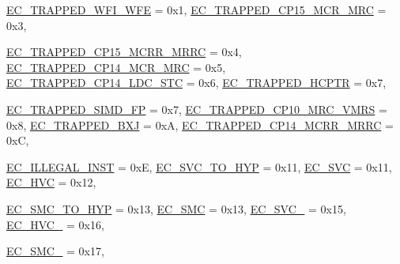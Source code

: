\begin{DoxyCompactItemize}
\hyperlink{namespaceArmISA_a04034d12009cf36227f4d2abff3331a2a7831a48e786b2211c5757053c628fb37}{EC\_\-TRAPPED\_\-WFI\_\-WFE} =  0x1, 
\hyperlink{namespaceArmISA_a04034d12009cf36227f4d2abff3331a2a7326abbdb0c5aa8868f49e78499eba5e}{EC\_\-TRAPPED\_\-CP15\_\-MCR\_\-MRC} =  0x3, 
\par
\hyperlink{namespaceArmISA_a04034d12009cf36227f4d2abff3331a2ae41f0031978e2f2e12002fba1d4f6a31}{EC\_\-TRAPPED\_\-CP15\_\-MCRR\_\-MRRC} =  0x4, 
\hyperlink{namespaceArmISA_a04034d12009cf36227f4d2abff3331a2a8a5017e4c7ca5216f0410d21036353f8}{EC\_\-TRAPPED\_\-CP14\_\-MCR\_\-MRC} =  0x5, 
\hyperlink{namespaceArmISA_a04034d12009cf36227f4d2abff3331a2ac33900dd88579a4aa9bae803767ed0c8}{EC\_\-TRAPPED\_\-CP14\_\-LDC\_\-STC} =  0x6, 
\hyperlink{namespaceArmISA_a04034d12009cf36227f4d2abff3331a2a899543f43806081dbcfe81a4b9a95b60}{EC\_\-TRAPPED\_\-HCPTR} =  0x7, 
\par
\hyperlink{namespaceArmISA_a04034d12009cf36227f4d2abff3331a2a3d4170a7cceedfc489d0ae7c1c9eb8e5}{EC\_\-TRAPPED\_\-SIMD\_\-FP} =  0x7, 
\hyperlink{namespaceArmISA_a04034d12009cf36227f4d2abff3331a2ac72c24870c9cd495bee1ae47130f4b15}{EC\_\-TRAPPED\_\-CP10\_\-MRC\_\-VMRS} =  0x8, 
\hyperlink{namespaceArmISA_a04034d12009cf36227f4d2abff3331a2ab0a91ec0cef7a2eb141d3243d69e38a9}{EC\_\-TRAPPED\_\-BXJ} =  0xA, 
\hyperlink{namespaceArmISA_a04034d12009cf36227f4d2abff3331a2a93c43a851e130dcb5065a53947f1689e}{EC\_\-TRAPPED\_\-CP14\_\-MCRR\_\-MRRC} =  0xC, 
\par
\hyperlink{namespaceArmISA_a04034d12009cf36227f4d2abff3331a2a9516886bbf1b55fd57b83d8e303eae33}{EC\_\-ILLEGAL\_\-INST} =  0xE, 
\hyperlink{namespaceArmISA_a04034d12009cf36227f4d2abff3331a2aeef28e1b068793c10bc30feb6efe2af0}{EC\_\-SVC\_\-TO\_\-HYP} =  0x11, 
\hyperlink{namespaceArmISA_a04034d12009cf36227f4d2abff3331a2a765f8b894a0b0e643c3d7e9147914f8a}{EC\_\-SVC} =  0x11, 
\hyperlink{namespaceArmISA_a04034d12009cf36227f4d2abff3331a2a501829f9087619157c26ce7e6a117abb}{EC\_\-HVC} =  0x12, 
\par
\hyperlink{namespaceArmISA_a04034d12009cf36227f4d2abff3331a2accc170f9cef44ae4617ab0f86bc56cb4}{EC\_\-SMC\_\-TO\_\-HYP} =  0x13, 
\hyperlink{namespaceArmISA_a04034d12009cf36227f4d2abff3331a2a8c961b3ba70ec48f8318449cfbe53f55}{EC\_\-SMC} =  0x13, 
\hyperlink{namespaceArmISA_a04034d12009cf36227f4d2abff3331a2a00178dc3ca6d98fb310130aaa1c37c7e}{EC\_\-SVC\_} =  0x15, 
\hyperlink{namespaceArmISA_a04034d12009cf36227f4d2abff3331a2a3124fcbf99991e4633f3dcaf0062c662}{EC\_\-HVC\_} =  0x16, 
\par
\hyperlink{namespaceArmISA_a04034d12009cf36227f4d2abff3331a2a8112fad5e7f8e56fdbc7c52e31cfca34}{EC\_\-SMC\_} =  0x17, 

\end{DoxyCompactItemize}
